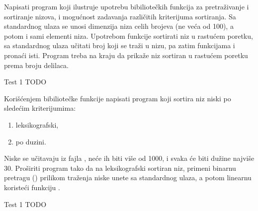 \begin{Exercise}[label=517]
  Napisati program koji ilustruje upotrebu bibiliotečkih funkcija za
  pretraživanje i sortiranje nizova, i mogućnost zadavanja različitih
  kriterijuma sortiranja. Sa standardnog ulaza se unosi dimenzija niza
  celih brojeva (ne veća od 100), a potom i sami elementi
  niza. Upotrebom funkcije  sortirati niz u rastućem
  poretku, sa standardnog ulaza učitati broj koji se traži u nizu, pa
  zatim funkcijama  i  pronaći
  isti. Program treba na kraju da prikaže niz sortiran u rastućem
  poretku prema broju delilaca.
  
\begin{miditest}
\begin{test}{Test 1}
TODO
\end{test}
\end{miditest}
  
\end{Exercise}

\begin{Exercise}[label=518]
   Korišćenjem bibiliotečke funkcije  napisati program
   koji sortira niz niski po sledećim kriterijumima:
   \begin{enumerate}
   \item leksikografski,
   \item po duzini.
   \end{enumerate}
   Niske se učitavaju iz fajla , neće ih biti više od
   1000, i svaka će biti dužine najviše 30. Proširiti program tako da
   na leksikografski sortiran niz, primeni binarnu pretragu
   () prilikom traženja niske unete sa standardnog
   ulaza, a potom linearnu koristeći funkciju .
  
\begin{miditest}
\begin{test}{Test 1}
TODO
\end{test}
\end{miditest}
  
\end{Exercise}

